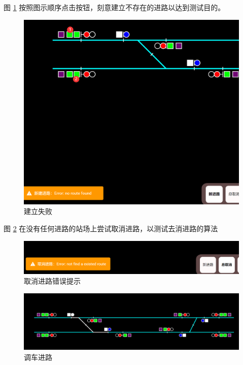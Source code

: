 图 \ref{creerr} 按照图示顺序点击按钮，刻意建立不存在的进路以达到测试目的。
\begin{figure}[htbp!]
  \centering
  \includegraphics[width=\textwidth]{figures/png/creerr.png}
  \caption{\label{creerr}建立失败}
\end{figure}

图 \ref{err} 在没有任何进路的站场上尝试取消进路，以测试去消进路的算法
\begin{figure}[htbp!]
  \centering
  \includegraphics[width=\textwidth]{figures/png/err.png}
  \caption{\label{err}取消进路错误提示}
\end{figure}

\begin{figure}[htbp!]
  \centering
  \includegraphics[width=\textwidth]{figures/png/shunt.png}
  \caption{\label{shunt}调车进路}
\end{figure}

